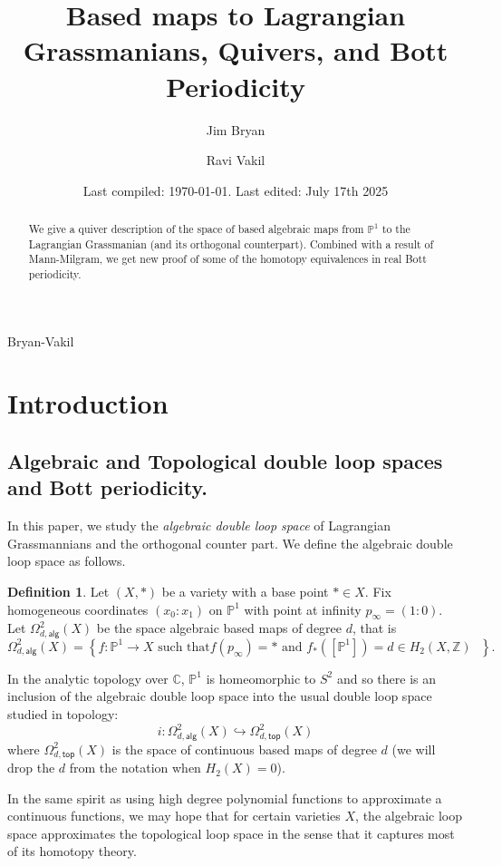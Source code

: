 \documentclass{amsart}
\title{Based maps to Lagrangian Grassmanians, Quivers, and Bott Periodicity}
\date{Last compiled:  \today.  Last edited: July 17th 2025}
\author{Jim Bryan}
\author{Ravi Vakil}
\theoremstyle{definition}
\newtheorem{definition}[theorem]{Definition}
\newcommand{\CC} {{\mathbb C}}          %
\newcommand{\ZZ} {{\mathbb Z}}		%
\newcommand{\PP}{\mathbb{P}}
\newcommand{\alg}{\mathsf{alg}}
\renewcommand{\top}{\mathsf{top}}
\newcommand{\LoopTwo}{\Omega^{2}_{d,\alg}}
\newcommand{\LoopTwoTop}{\Omega^{2}_{d,\top}}
\begin{document}
\begin{abstract}
We give a quiver description of the space of based algebraic maps from
$\PP^{1}$ to the Lagrangian Grassmanian (and its orthogonal
counterpart). Combined with a result of Mann-Milgram, we get new proof of some
of the homotopy equivalences in real Bott periodicity.
\end{abstract}

\maketitle 

  {Bryan-Vakil}


\tableofcontents
\pagebreak

\section{Introduction}\label{sec: intro}



\subsection{Algebraic and Topological double loop spaces and Bott periodicity.}

In this paper, we study the \emph{algebraic double loop space} of
Lagrangian Grassmannians and the orthogonal counter part. We define the
algebraic double loop space as follows.

\begin{definition}\label{defn: Omega2alg(X)}
Let $(X,*)$ be a variety with a base point $*\in X$. Fix homogeneous
coordinates $(x_{0}:x_{1})$ on $\PP^{1}$ with point at infinity
$p_{\infty}=(1:0)$. Let $\LoopTwo(X)$ be the space algebraic based
maps of degree $d$, that is
\[
\LoopTwo (X) = \left\{f:\PP^{1}\to X\text{ such that
$f(p_{\infty})=*$ and $f_{*}([\PP^{1}])=d\in H_{2}(X,\ZZ )$ } \right\} .
\]
\end{definition}

In the analytic topology over $\CC$, $\PP^{1}$ is homeomorphic to
$S^{2}$ and so there is an inclusion of the algebraic double loop
space into the usual double loop space studied in topology:
\[
i:\LoopTwo (X) \hookrightarrow \LoopTwoTop (X)
\]
where $\LoopTwoTop (X)$ is the space of continuous based maps of
degree $d$ (we will drop the $d$ from the notation when $H_{2}(X)=0$).

In the same spirit as using high degree polynomial functions to
approximate a continuous functions, we may hope that for certain
varieties $X$, the algebraic loop space approximates the topological
loop space in the sense that it captures most of its homotopy theory.
\end{document}
